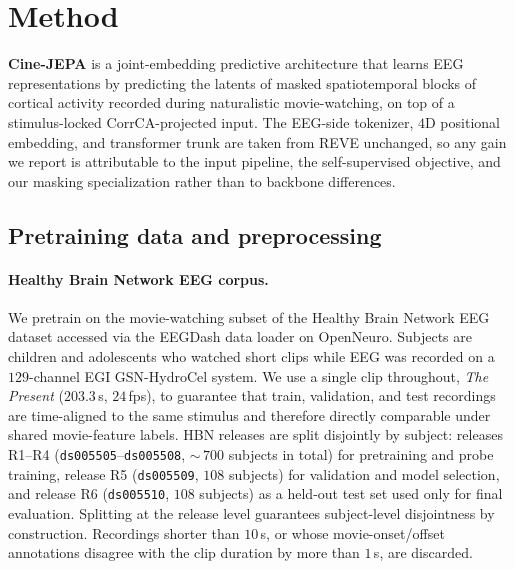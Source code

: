 
\section{Method}
\label{sec:method}

\textbf{Cine-JEPA} is a joint-embedding predictive architecture
\citep{lecun2022jepa,assran2023ijepa,bardes2024vjepa,assran2025vjepa2}
that learns EEG representations by predicting the latents of masked
spatiotemporal blocks of cortical activity recorded during
naturalistic movie-watching, on top of a stimulus-locked
CorrCA-projected input. The EEG-side tokenizer, $4$D positional
embedding, and transformer trunk are taken from REVE
\citep{elouahidi2025reve} unchanged, so any gain we report is
attributable to the input pipeline, the self-supervised objective,
and our masking specialization rather than to backbone differences.

\subsection{Pretraining data and preprocessing}
\label{sec:method:data}

\paragraph{Healthy Brain Network EEG corpus.}
We pretrain on the movie-watching subset of the Healthy Brain Network
EEG dataset \citep{alexander2017hbn} accessed via the EEGDash data
loader \citep{tousignant2024eegdash} on OpenNeuro. Subjects are
children and adolescents who watched short clips while EEG was
recorded on a $129$-channel EGI GSN-HydroCel system. We use a single
clip throughout, \textit{The Present} ($203.3$\,s, $24$\,fps), to
guarantee that train, validation, and test recordings are time-aligned
to the same stimulus and therefore directly comparable under shared
movie-feature labels. HBN releases are split disjointly by subject:
releases R1--R4 (\texttt{ds005505}--\texttt{ds005508}, ${\sim}\,700$
subjects in total) for pretraining and probe training, release R5
(\texttt{ds005509}, $108$ subjects) for validation and model
selection, and release R6 (\texttt{ds005510}, $108$ subjects) as a
held-out test set used only for final evaluation. Splitting at the
release level guarantees subject-level disjointness by construction.
Recordings shorter than $10$\,s, or whose movie-onset/offset
annotations disagree with the clip duration by more than $1$\,s, are
discarded.

